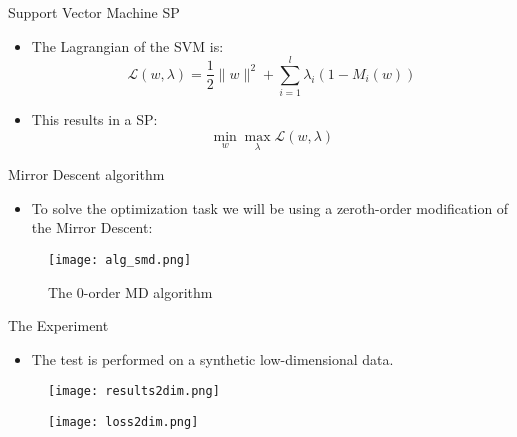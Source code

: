 \documentclass{beamer}
\begin{document}
\begin{frame}{Support Vector Machine SP}

\begin{itemize}
\item The Lagrangian of the SVM is:
\[\mathcal{L}(w, \lambda) = \frac{1}{2}\lVert w \rVert^2 + \sum\limits_{i=1}^l \lambda_i (1 - M_i(w))\]

\item This results in a SP:
\[ \min\limits_{w}\max\limits_{\lambda}\mathcal{L}(w, \lambda)\]

\end{itemize}
    
\end{frame}

\begin{frame}{Mirror Descent algorithm}
\begin{itemize}
    \item To solve the optimization task we will be using a zeroth-order modification of the Mirror Descent:
    \end{itemize}
    \bigskip
    \begin{figure}
        \centering
        \texttt{[image: alg\_smd.png]}
        \caption{The 0-order MD algorithm}
        \label{fig:my_label}
    \end{figure}
    
\end{frame}

\begin{frame}{The Experiment}
\begin{itemize}
    \item The test is performed on a synthetic low-dimensional data.
\end{itemize}  

\begin{figure}
\centering
\begin{minipage}{.5\textwidth}
  \centering
  \texttt{[image: results2dim.png]}
  \label{fig:test1}
\end{minipage}%
\begin{minipage}{.5\textwidth}
  \centering
  \texttt{[image: loss2dim.png]}
  \label{fig:test2}
\end{minipage}
\end{figure}




\end{frame}
\end{document}
